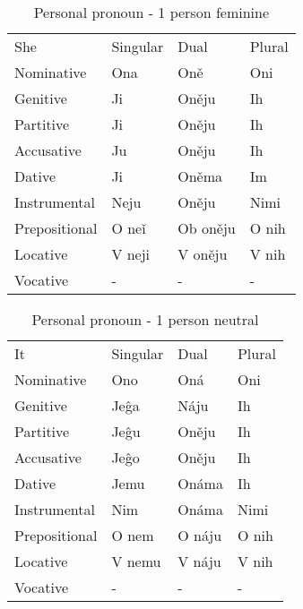 \begin{table}[!htb]
	\caption{Personal pronoun - 1 person feminine}
	\begin{tabular}{llll}
		She & Singular & Dual & Plural \\
		Nominative & Ona & Oně & Oni \\
		Genitive & Ji & Oněju & Ih \\
		Partitive & Ji & Oněju & Ih \\
		Accusative & Ju & Oněju & Ih \\
		Dative & Ji & Oněma & Im \\
		Instrumental & Neju & Oněju & Nimi \\
		Prepositional & O neǐ & Ob oněju & O nih \\
		Locative & V neji & V oněju & V nih \\
		Vocative & - & - & -
	\end{tabular}
\end{table}

\begin{table}[!htb]
	\caption{Personal pronoun - 1 person neutral}
	\begin{tabular}{llll}
		It & Singular & Dual & Plural \\
		Nominative & Ono & Oná & Oni \\
		Genitive & Jeĝa & Náju & Ih \\
		Partitive & Jeĝu & Oněju & Ih \\
		Accusative & Jeĝo & Oněju & Ih \\
		Dative & Jemu & Onáma & Ih \\
		Instrumental & Nim & Onáma & Nimi \\
		Prepositional & O nem & O náju & O nih \\
		Locative & V nemu & V náju & V nih \\
		Vocative & - & - & -
	\end{tabular}
\end{table}
